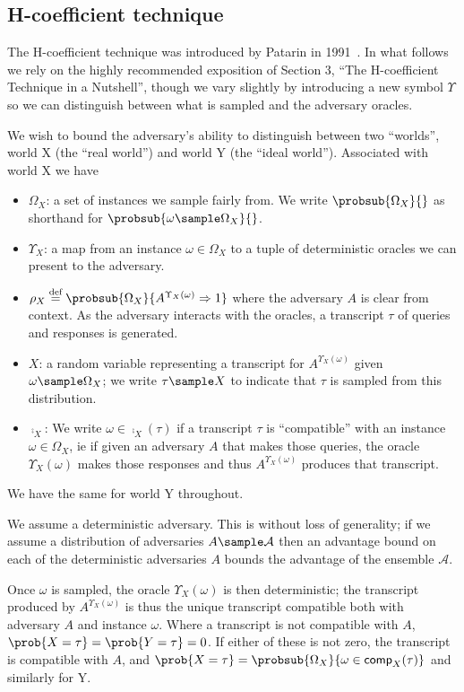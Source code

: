 \documentclass[eprint.tex]{subfiles}
\begin{document}
\subsection{H-coefficient technique}
The H-coefficient technique was introduced by Patarin in 1991~\cite{ppdes,hco}.
In what follows we rely on the highly recommended exposition of
\cite{hco2} Section 3,
``The H-coefficient Technique in a Nutshell'', though we vary slightly by introducing
a new symbol $\Upsilon$ so we can distinguish between what is sampled and the adversary oracles.

We wish to bound the adversary's ability to distinguish between
two ``worlds'', world X (the ``real world'') and world Y (the ``ideal world'').
Associated with world X we have
\begin{itemize}
    \item $\Omega_X$: a set of instances we sample fairly from. We write
    $\probsub{\Omega_X}{}$ as shorthand for $\probsub{\omega \sample \Omega_X}{}$.
    \item $\Upsilon_X$: a map from an instance $\omega \in \Omega_X$ to a tuple of
    deterministic oracles we can present to the adversary.
    \item $\rho_X \defeq \probsub{\Omega_X}{A^{\Upsilon_X(\omega)} \Rightarrow 1}$\label{rhox}
    where the adversary $A$ is clear from context.
    As the adversary interacts with the oracles, a transcript $\tau$
    of queries and responses is generated.
    \item $X$: a random variable representing a transcript for $A^{\Upsilon_X(\omega)}$
    given $\omega \sample \Omega_X$; we write $\tau \sample X$
    to indicate that $\tau$ is sampled from this distribution.
    \item $\comp_X$:  We write $\omega \in \comp_X(\tau)$
    if a transcript $\tau$ is ``compatible'' with an instance $\omega \in \Omega_X$,
    ie if given an adversary $A$ that makes those queries, the oracle $\Upsilon_X(\omega)$
    makes those responses and thus $A^{\Upsilon_X(\omega)}$ produces that transcript.
\end{itemize}
We have the same for world Y throughout.

We assume a deterministic adversary. This is without loss of
generality; if we assume a distribution of adversaries $A \sample \mathcal{A}$
then an advantage bound on each of the deterministic adversaries $A$ bounds the advantage
of the ensemble $\mathcal{A}$.

Once $\omega$ is sampled, the oracle $\Upsilon_X(\omega)$ is then deterministic;
the transcript produced by $A^{\Upsilon_X(\omega)}$ is thus the unique transcript
compatible both with adversary $A$ and instance $\omega$. Where a transcript
is not compatible with $A$, $\prob{X = \tau} = \prob{Y = \tau} = 0$. If either
of these is not zero, the transcript is compatible with $A$, and
$\prob{X = \tau} = \probsub{\Omega_X}{\omega \in \comp_X(\tau)}$ and similarly for Y.
\end{document}
